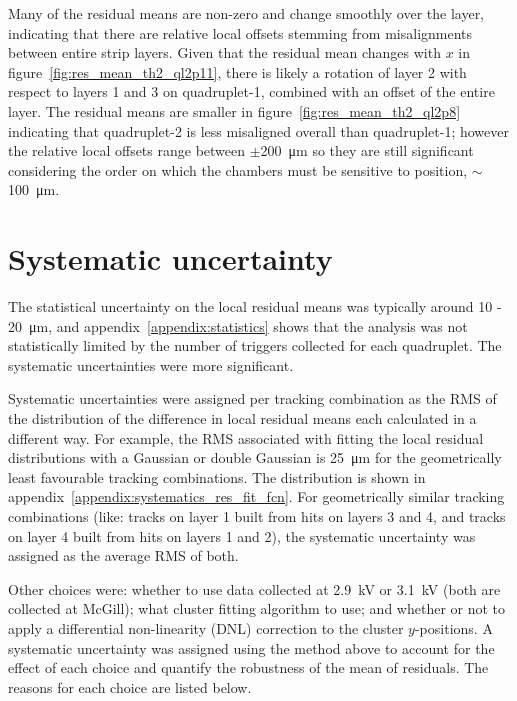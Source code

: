 Many of the residual means are non-zero and change smoothly over the layer, indicating that there are relative local offsets stemming from misalignments between entire strip layers. Given that the residual mean changes with $x$ in figure~\ref{fig:res_mean_th2_ql2p11}, there is likely a rotation of layer 2 with respect to layers 1 and 3 on quadruplet-1, combined with an offset of the entire layer. The residual means are smaller in figure~\ref{fig:res_mean_th2_ql2p8} indicating that quadruplet-2 is less misaligned overall than quadruplet-1; however the relative local offsets range between $\pm$\SI{200}{\micro\meter} so they are still significant considering the order on which the chambers must be sensitive to position, $\sim$\SI{100}{\micro\meter}.

\section{Systematic uncertainty}
\label{sec:cosmics_sys_uncerts}

The statistical uncertainty on the local residual means was typically around \SI{10}{} - \SI{20}{\micro\meter}, and appendix~\ref{appendix:statistics} shows that the analysis was not statistically limited by the number of triggers collected for each quadruplet. The systematic uncertainties were more significant. 

Systematic uncertainties were assigned per tracking combination as the RMS of the distribution of the difference in local residual means each calculated in a different way. For example, the RMS associated with fitting the local residual distributions with a Gaussian or double Gaussian is \SI{25}{\micro\meter} for the geometrically least favourable tracking combinations. The distribution is shown in appendix~\ref{appendix:systematics_res_fit_fcn}. For geometrically similar tracking combinations (like: tracks on layer 1 built from hits on layers 3 and 4, and tracks on layer 4 built from hits on layers 1 and 2), the systematic uncertainty was assigned as the average RMS of both.

Other choices were: whether to use data collected at 2.9~kV or 3.1~kV (both are collected at McGill); what cluster fitting algorithm to use; and whether or not to apply a differential non-linearity (DNL) correction to the cluster $y$-positions. A systematic uncertainty was assigned using the method above to account for the effect of each choice and quantify the robustness of the mean of residuals. The reasons for each choice are listed below.

